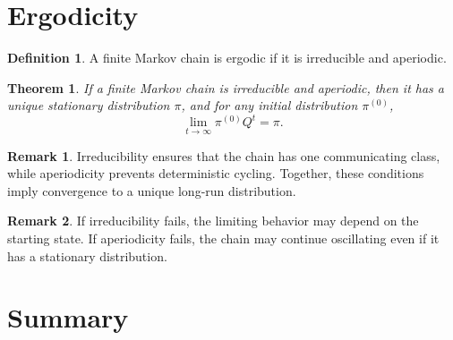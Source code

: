 \documentclass[12pt,oneside]{book}
\numberwithin{equation}{section}
\theoremstyle{definition}
\newtheorem{definition}{Definition}[section]
\newtheorem{remark}{Remark}[section]
\theoremstyle{plain}
\newtheorem{theorem}{Theorem}[section]
\theoremstyle{remark}
\begin{document}
\section{Ergodicity}

\begin{definition}
A finite Markov chain is ergodic if it is irreducible and aperiodic.
\end{definition}

\begin{theorem}
If a finite Markov chain is irreducible and aperiodic, then it has a unique stationary distribution $\pi$, and for any initial distribution $\pi^{(0)}$,
\[
\lim_{t\to\infty}\pi^{(0)}Q^t=\pi.
\]
\end{theorem}

\begin{remark}
Irreducibility ensures that the chain has one communicating class, while aperiodicity prevents deterministic cycling. Together, these conditions imply convergence to a unique long-run distribution.
\end{remark}

\begin{remark}
If irreducibility fails, the limiting behavior may depend on the starting state. If aperiodicity fails, the chain may continue oscillating even if it has a stationary distribution.
\end{remark}

\section{Summary}
\end{document}

